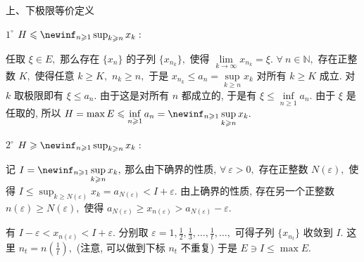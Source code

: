 \begin{frame}{上、下极限等价定义}

{
\smaller[1]

$1^\circ$ $H \leqslant \newinf_{n \geqslant 1} \sup_{k \geqslant n} x_k:$

\pause

任取 $\xi \in E,$ 那么存在 $\{x_n\}$ 的子列 $\{x_{n_k}\},$ 使得 $\lim\limits_{k\to\infty} x_{n_k} = \xi.$ $\forall ~ n \in \mathbb{N},$ 存在正整数 $K,$ 使得任意 $k \geqslant K,$ $n_k \geqslant n,$ 于是 $x_{n_k} \leqslant a_n = \sup\limits_{k \geqslant n} x_k$ 对所有 $k \geqslant K$ 成立. 对 $k$ 取极限即有 $\xi \leqslant a_n.$
\pause
由于这是对所有 $n$ 都成立的, 于是有 $\xi \leqslant \inf\limits_{n \geqslant 1}a_n.$ 由于 $\xi$ 是任取的, 所以 $\displaystyle H = \max E \leqslant \inf_{n \geqslant 1}a_n = \newinf_{n \geqslant 1} \sup_{k \geqslant n} x_k.$

\pause
\vspace*{0.5em}

$2^\circ$ $H \geqslant \newinf_{n \geqslant 1} \sup_{k \geqslant n} x_k:$

\pause

记 $\displaystyle I = \newinf_{n \geqslant 1} \sup_{k \geqslant n} x_k,$ 那么由下确界的性质, $\forall~\varepsilon > 0,$ 存在正整数 $N(\varepsilon),$ 使得 $\displaystyle I \leqslant \sup_{k \geqslant N(\varepsilon)} x_k = a_{N(\varepsilon)} < I + \varepsilon.$ 由上确界的性质, 存在另一个正整数 $n(\varepsilon) \geqslant N(\varepsilon),$ 使得 $\displaystyle a_{N(\varepsilon)} \geqslant x_{n(\varepsilon)} > a_{N(\varepsilon)} - \varepsilon.$

\begin{center}
\end{center}

有 $I - \varepsilon < x_{n(\varepsilon)} < I + \varepsilon.$ 分别取 $\varepsilon = 1, \frac{1}{2}, \frac{1}{3}, \dots, \frac{1}{t}, \dots,$ 可得子列 $\{x_{n_t}\}$ 收敛到 $I.$ 这里 $n_t = n(\frac{1}{t}),$ (注意, 可以做到下标 $n_t$ 不重复) 于是 $E \ni I \leqslant \max E.$

}

\end{frame}

